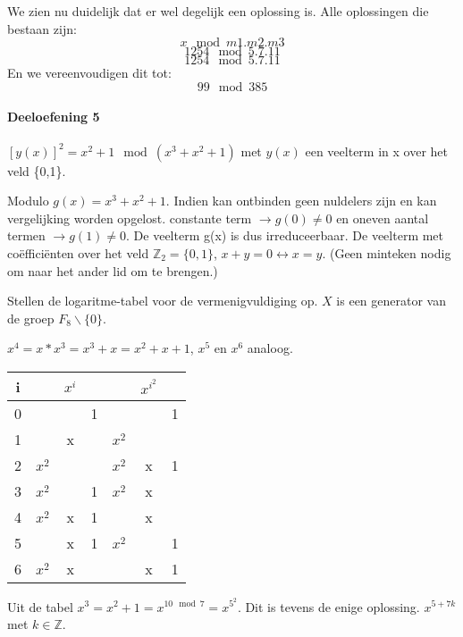 \documentclass[12pt]{article}
\begin{document}
    We zien nu duidelijk dat er wel degelijk een oplossing is.
    Alle oplossingen die bestaan zijn:
    \begin{equation}
        x \mod m1.m2.m3        
    \end{equation}
    \begin{equation}
        1254 \mod 5.7.11
    \end{equation}
    \begin{equation}
        1254 \mod 5.7.11
    \end{equation}
    En we vereenvoudigen dit tot:
    \begin{equation}
        99 \mod 385
    \end{equation}
    
    
    \paragraph{Deeloefening 5}
    
	$ [y(x)]^2 = x^2 +1 \mod(x^3 + x^2 +1)$ met $y(x)$ een veelterm in x over het veld \{0,1\}.

	Modulo $g(x) = x^3 + x^2 +1$. Indien kan ontbinden  geen nuldelers zijn en
	kan vergelijking worden opgelost. constante term  $\rightarrow g(0) \neq 0 $ en oneven aantal termen $\rightarrow g(1) \neq 0  $. De veelterm g(x) is dus irreduceerbaar. De veelterm met co\"effici\"enten over het veld $\mathbb{Z}_{2}= \{0,1\}$, $x+y=0 \leftrightarrow x=y $. (Geen minteken nodig om naar het ander lid om te brengen.) 

	Stellen de logaritme-tabel voor de vermenigvuldiging op. $X$ is een generator van de groep $F_8 \backslash \{0\}$.

	$x^4 = x * x^3 = x^3 + x = x^2 + x +1$, $x^5$ en $x^6$ analoog.

	\begin{table}[H]
	\centering
	\begin{tabular}{|c | c | c | c || c | c | c|}
	\hline
	\bf{i}    &       & \bf{$x^i$} &    &       &  \bf{$x^{i^2}$} &  \\ 
	\hline
	0    &       &      & 1   &       &       & 1  \\ 
	1    &       & x    &     & $x^2$ &       &    \\
	2    & $x^2$ &      &     & $x^2$ & x     & 1  \\
	3    & $x^2$ &      & 1   & $x^2$ & x     &    \\
	4    & $x^2$ & x    & 1   &       & x     &    \\
	5    &       & x    & 1   & $x^2$ &       & 1  \\
	6    & $x^2$ & x    &     &       & x     & 1 \\
	\hline
	\end{tabular}
	\end{table}

	Uit de tabel $x^3 = x^2 +1 = x^{10 \mod 7}=x^{5^2}$. Dit is tevens de enige oplossing. 
	$x^{5+7k}$ met $k \in \mathbb{Z}$.
\end{document}
